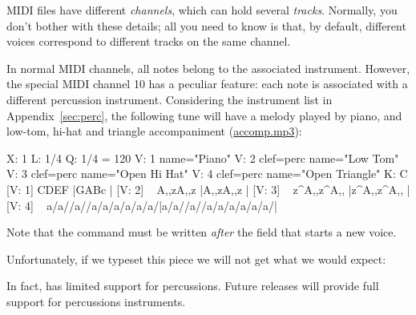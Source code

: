 \documentclass[a4paper,fullpage,12pt]{book}
\begin{document}
MIDI files have different \emph{channels}, which can hold several
\emph{tracks}. Normally, you don't bother with these details; all you
need to know is that, by default, different voices correspond to
different tracks on the same channel.

In normal MIDI channels, all notes belong to the associated
instrument. However, the special MIDI channel 10 has a peculiar
feature: each note is associated with a different percussion
instrument. Considering the instrument list in
Appendix~\ref{sec:perc}, the following tune will have a melody played
by piano, and low-tom, hi-hat and triangle accompaniment
(\href{run:accomp.mp3}{accomp.mp3}):

\begin{abcsource}
X: 1
L: 1/4
Q: 1/4 = 120
V: 1 name="Piano"
V: 2 clef=perc name="Low Tom"
V: 3 clef=perc name="Open Hi Hat"
V: 4 clef=perc name="Open Triangle"
K: C
%
[V: 1] CDEF         |GABc                | %
[V: 2] \
A,,zA,,z            |A,,zA,,z            | %
[V: 3] \
z^A,,z^A,,          |z^A,,z^A,,          | %
[V: 4] \
a/a//a//a/a/a/a/a/a/|a/a//a//a/a/a/a/a/a/| %
\end{abcsource}

Note that the \metacmd{MIDI channel 10} command must be written
\emph{after} the  field that starts a new voice.

Unfortunately, if we typeset this piece we will not get what we would
expect:

\score{perc}

In fact, \abcm{} has limited support for percussions. Future releases
will provide full support for percussions instruments.







\end{document}
